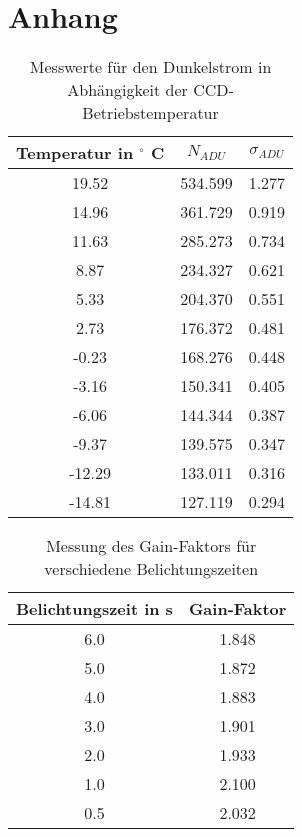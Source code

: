 \section{Anhang}

\begin{table}[h!]
\centering
\begin{tabular}{c c c}
Temperatur in $^\circ$ C & $N_{ADU}$ & $\sigma_{ADU}$ \\
\hline
19.52	& 534.599	& 1.277\\
14.96	& 361.729	& 0.919\\
11.63	& 285.273	& 0.734\\
8.87	& 234.327	& 0.621\\
5.33	& 204.370	& 0.551\\
2.73	& 176.372	& 0.481\\
-0.23	& 168.276	& 0.448\\
-3.16	& 150.341	& 0.405\\
-6.06	& 144.344	& 0.387\\
-9.37	& 139.575	& 0.347\\
-12.29	& 133.011	& 0.316\\
-14.81	& 127.119	& 0.294\\
\end{tabular}
\caption{Messwerte für den Dunkelstrom in Abhängigkeit der CCD-Betriebstemperatur}
\label{tbl:adu_temp}
\end{table}

\begin{table}[h!]
\centering
\begin{tabular}{c c}
Belichtungszeit in s & Gain-Faktor\\
\hline
6.0 & 1.848\\
5.0 & 1.872\\
4.0 & 1.883\\
3.0	& 1.901\\
2.0 & 1.933\\
1.0 & 2.100\\
0.5	& 2.032\\
\end{tabular}
\caption{Messung des Gain-Faktors für verschiedene Belichtungszeiten}
\label{tbl:gain}
\end{table}

